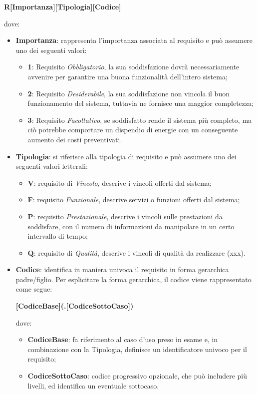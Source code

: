 \begin{center}
\textbf{R[Importanza][Tipologia][Codice]}
\end{center}
dove:
\begin{itemize}
\item \textbf{Importanza}: rappresenta l’importanza associata al requisito e può assumere uno dei seguenti valori:
\begin{itemize}
	\item \textbf{1}: Requisito \textit{Obbligatorio}, la sua soddisfazione dovrà necessariamente avvenire per garantire una buona funzionalità dell’intero sistema;
	\item \textbf{2}: Requisito \textit{Desiderabile}, la sua soddisfazione non vincola il buon funzionamento del sistema, tuttavia ne fornisce una maggior completezza;
	\item \textbf{3}: Requisito \textit{Facoltativo}, se soddisfatto rende il sistema più completo, ma ciò potrebbe comportare un dispendio di energie con un conseguente aumento dei costi preventivati.
\end{itemize}
\item \textbf{Tipologia}: si riferisce alla tipologia di requisito e può assumere uno dei seguenti valori letterali:
\begin{itemize}
	\item \textbf{V}: requisito di \textit{Vincolo}, descrive i vincoli offerti dal sistema;
	\item \textbf{F}: requisito \textit{Funzionale}, descrive servizi o funzioni offerti dal sistema;
	\item \textbf{P}: requisito \textit{Prestazionale}, descrive i vincoli sulle prestazioni da soddisfare, con il numero di informazioni da manipolare in un certo intervallo di tempo;
	\item \textbf{Q}: requisito di \textit{Qualità}, descrive i vincoli di qualità da realizzare (xxx).
\end{itemize}
\item \textbf{Codice}: identifica in maniera univoca il requisito in forma gerarchica padre/figlio.
Per esplicitare la forma gerarchica, il codice viene rappresentato come segue:
\begin{center}
\textbf{[CodiceBase](.[CodiceSottoCaso])}
\end{center}
dove: 
\begin{itemize}
	\item \textbf{CodiceBase}: fa riferimento al caso d’uso preso in esame e, in combinazione con la Tipologia, definisce un identificatore univoco per il requisito;
	\item \textbf{CodiceSottoCaso}: codice progressivo opzionale, che può includere più livelli, ed identifica un eventuale sottocaso.
\end{itemize}
\end{itemize}

